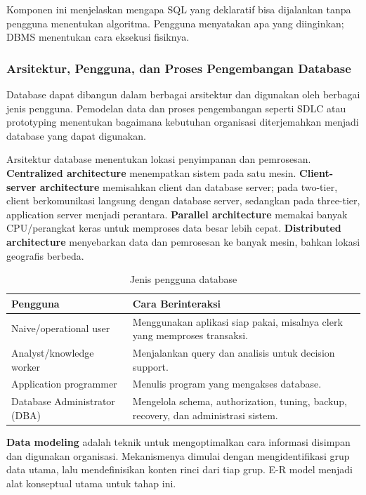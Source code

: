 Komponen ini menjelaskan mengapa SQL yang deklaratif bisa dijalankan tanpa pengguna menentukan algoritma. Pengguna menyatakan apa yang diinginkan; DBMS menentukan cara eksekusi fisiknya.

\subsubsection{Arsitektur, Pengguna, dan Proses Pengembangan Database}

\begin{jawab}
Database dapat dibangun dalam berbagai arsitektur dan digunakan oleh berbagai jenis pengguna. Pemodelan data dan proses pengembangan seperti SDLC atau prototyping menentukan bagaimana kebutuhan organisasi diterjemahkan menjadi database yang dapat digunakan.
\end{jawab}

Arsitektur database menentukan lokasi penyimpanan dan pemrosesan. \textbf{Centralized architecture} menempatkan sistem pada satu mesin. \textbf{Client-server architecture} memisahkan client dan database server; pada two-tier, client berkomunikasi langsung dengan database server, sedangkan pada three-tier, application server menjadi perantara. \textbf{Parallel architecture} memakai banyak CPU/perangkat keras untuk memproses data besar lebih cepat. \textbf{Distributed architecture} menyebarkan data dan pemrosesan ke banyak mesin, bahkan lokasi geografis berbeda.

\begin{table}[H]
\centering
\begin{tabularx}{\textwidth}{|L{0.28\textwidth}|X|}
\hline
\textbf{Pengguna} & \textbf{Cara Berinteraksi} \\
\hline
Naive/operational user & Menggunakan aplikasi siap pakai, misalnya clerk yang memproses transaksi. \\
\hline
Analyst/knowledge worker & Menjalankan query dan analisis untuk decision support. \\
\hline
Application programmer & Menulis program yang mengakses database. \\
\hline
Database Administrator (DBA) & Mengelola schema, authorization, tuning, backup, recovery, dan administrasi sistem. \\
\hline
\end{tabularx}
\caption{Jenis pengguna database}
\label{tab:database-users}
\end{table}

\textbf{Data modeling} adalah teknik untuk mengoptimalkan cara informasi disimpan dan digunakan organisasi. Mekanismenya dimulai dengan mengidentifikasi grup data utama, lalu mendefinisikan konten rinci dari tiap grup. E-R model menjadi alat konseptual utama untuk tahap ini.

